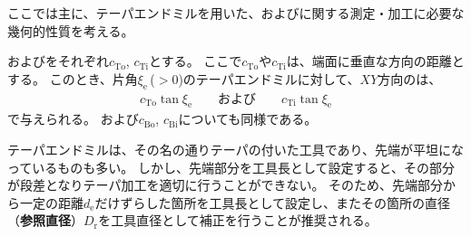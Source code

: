 

ここでは主に、テーパエンドミルを用いた、\textbf{\EndFaceOutCChamfer}および\textbf{\EndFaceInCChamfer}に関する測定・加工に必要な幾何的性質を考える。



\TopEndFaceOutCChamferLength および\TopEndFaceInCChamferLength をそれぞれ$c_\mathrm{To}$, $c_\mathrm{Ti}$とする。
ここで$c_\mathrm{To}$や$c_\mathrm{Ti}$は、端面に垂直な方向の距離とする。
このとき、片角$\xi_\mathrm e$\,($>0$)のテーパエンドミルに対して、$XY$方向の\EndFaceCChamferLength は、
\begin{align*}
  c_\mathrm{To}\tan\xi_\mathrm e\qquad\text{および}\qquad c_\mathrm{Ti}\tan\xi_\mathrm e
\end{align*}
で与えられる。
\BottomEndFaceOutCChamferLength および\TopEndFaceInCChamferLength$c_\mathrm{Bo}$, $c_\mathrm{Bi}$についても同様である。



テーパエンドミルは、その名の通りテーパの付いた工具であり、先端が平坦になっているものも多い。
しかし、先端部分を工具長として設定すると、その部分が段差となりテーパ加工を適切に行うことができない。
そのため、先端部分から一定の距離$d_\mathrm e$だけずらした箇所を工具長として設定し、またその箇所の直径（\textbf{参照直径}）$D_\mathrm r$を工具直径として補正を行うことが推奨される。

